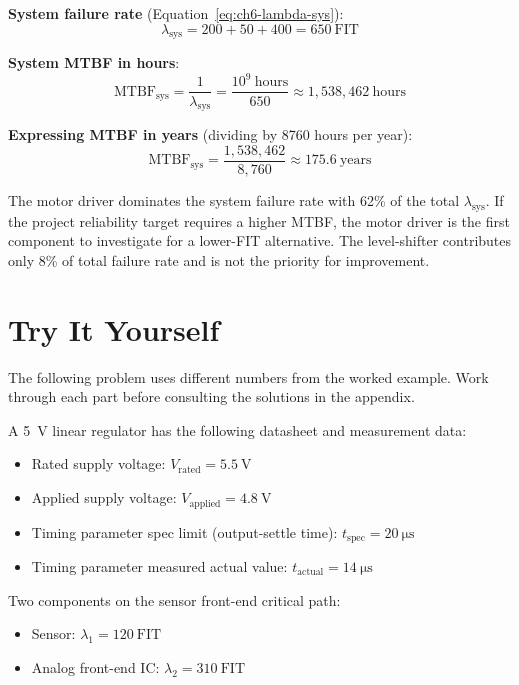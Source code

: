 \textbf{System failure rate} (Equation~\ref{eq:ch6-lambda-sys}):
\[
  \lambda_{\text{sys}} = 200 + 50 + 400 = 650~\mathrm{FIT}
\]

\textbf{System MTBF in hours}:
\[
  \mathrm{MTBF}_{\text{sys}} = \frac{1}{\lambda_{\text{sys}}} = \frac{10^{9}~\mathrm{hours}}{650} \approx 1{,}538{,}462~\mathrm{hours}
\]

\textbf{Expressing MTBF in years} (dividing by 8760 hours per year):
\[
  \mathrm{MTBF}_{\text{sys}} = \frac{1{,}538{,}462}{8{,}760} \approx 175.6~\mathrm{years}
\]

The motor driver dominates the system failure rate with 62\% of the total $\lambda_{\text{sys}}$.
If the project reliability target requires a higher MTBF, the motor driver is the first component to investigate for a lower-FIT alternative.
The level-shifter contributes only 8\% of total failure rate and is not the priority for improvement.

\section{Try It Yourself}
\label{sec:ch6-tiy}

The following problem uses different numbers from the worked example.
Work through each part before consulting the solutions in the appendix.

A 5~V linear regulator has the following datasheet and measurement data:
\begin{itemize}
  \item Rated supply voltage: $V_{\text{rated}} = 5.5~\mathrm{V}$
  \item Applied supply voltage: $V_{\text{applied}} = 4.8~\mathrm{V}$
  \item Timing parameter spec limit (output-settle time): $t_{\text{spec}} = 20~\mathrm{\mu s}$
  \item Timing parameter measured actual value: $t_{\text{actual}} = 14~\mathrm{\mu s}$
\end{itemize}

Two components on the sensor front-end critical path:
\begin{itemize}
  \item Sensor: $\lambda_1 = 120~\mathrm{FIT}$
  \item Analog front-end IC: $\lambda_2 = 310~\mathrm{FIT}$
\end{itemize}

